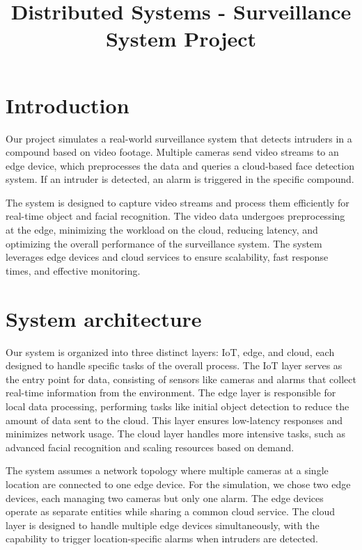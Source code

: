 \documentclass[conference]{IEEEtran}
\begin{document}
\title{Distributed Systems - Surveillance System Project}

\author{
\and 
{}
\and
{}
}

\maketitle

\section{Introduction}
Our project simulates a real-world surveillance system that detects intruders in a compound based on video footage. Multiple cameras send video streams to an edge device, which preprocesses the data and queries a cloud-based face detection system. If an intruder is detected, an alarm is triggered in the specific compound.

The system is designed to capture video streams and process them efficiently for real-time object and facial recognition. The video data undergoes preprocessing at the edge, minimizing the workload on the cloud, reducing latency, and optimizing the overall performance of the surveillance system. The system leverages edge devices and cloud services to ensure scalability, fast response times, and effective monitoring.  

\section{System architecture}
Our system is organized into three distinct layers: IoT, edge, and cloud, each designed to handle specific tasks of the overall process. The IoT layer serves as the entry point for data, consisting of sensors like cameras and alarms that collect real-time information from the environment. The edge layer is responsible for local data processing, performing tasks like initial object detection to reduce the amount of data sent to the cloud. This layer ensures low-latency responses and minimizes network usage. The cloud layer handles more intensive tasks, such as advanced facial recognition and scaling resources based on demand. 

The system assumes a network topology where multiple cameras at a single location are connected to one edge device. For the simulation, we chose two edge devices, each managing two cameras but only one alarm. The edge devices operate as separate entities while sharing a common cloud service. The cloud layer is designed to handle multiple edge devices simultaneously, with the capability to trigger location-specific alarms when intruders are detected.
\end{document}
